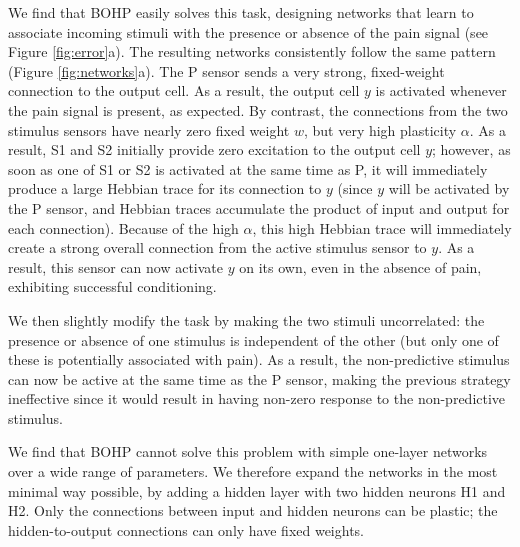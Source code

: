 \documentclass{article}
\begin{document}
We find that BOHP easily solves this task, designing networks that learn to
associate incoming stimuli with the presence or absence of the pain signal (see
Figure \ref{fig:error}a). The
resulting networks consistently follow the same pattern (Figure
\ref{fig:networks}a). The P sensor sends a
very strong, fixed-weight connection to the output cell. As a result, the output
cell $y$ is activated whenever the pain signal is present, as expected. By contrast, the
connections from the two stimulus
sensors have nearly zero fixed weight $w$, but very high plasticity $\alpha$. As
a result, S1 and S2 initially provide zero excitation to the  output cell $y$;
however, as soon as one of S1 or S2 is activated at the same time as P, it will
immediately produce a large Hebbian trace for its connection to $y$ (since $y$
will be activated by the P sensor, and Hebbian traces accumulate the product of
input and output for each connection). Because of the high $\alpha$, this high
Hebbian trace will immediately create a strong overall connection from the
active stimulus sensor to $y$. As a result, this sensor can now activate $y$ on
its own, even in the absence of pain, exhibiting successful conditioning.

We then slightly modify the task by making the two stimuli uncorrelated: the
presence or absence of one stimulus is independent of the other (but only one of
these is potentially associated with pain). As a result, the non-predictive
stimulus can now be active at the same time as the P sensor, making the previous
strategy ineffective since it would result in having non-zero response to the
non-predictive stimulus. 

We find that BOHP cannot solve this problem with simple one-layer networks over
a wide range of parameters. We therefore expand the networks in the most minimal
way possible, by adding a hidden layer with two hidden neurons H1 and H2. Only the connections between input and
hidden neurons can be plastic; the hidden-to-output connections can only have
fixed weights.
\end{document}
